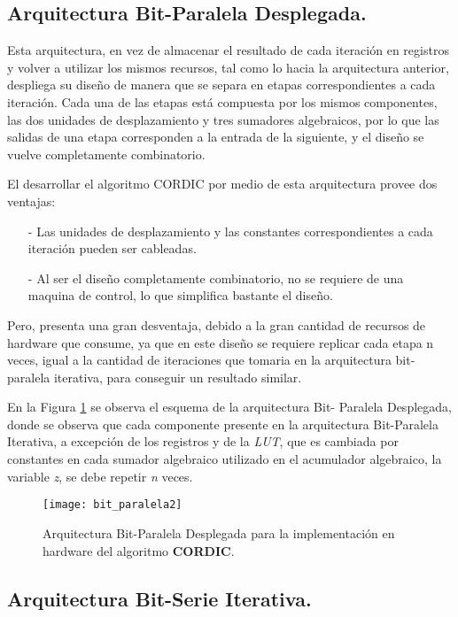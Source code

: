 \subsection{Arquitectura Bit-Paralela Desplegada.}


Esta arquitectura, en vez de almacenar el resultado de cada iteración en registros y volver a utilizar los mismos recursos, tal como lo hacia la arquitectura anterior, despliega su diseño de manera que se separa en etapas correspondientes a cada iteración. Cada una de las etapas está compuesta por los mismos componentes, las dos unidades de desplazamiento y tres sumadores algebraicos, por lo que las salidas de una etapa corresponden a la entrada de la siguiente, y el diseño se vuelve completamente combinatorio.

El desarrollar el algoritmo CORDIC por medio de esta arquitectura provee dos ventajas: 
\begin{itemize}
\item[-]	Las unidades de desplazamiento y las constantes correspondientes a cada iteración pueden ser cableadas.
\item[-]	Al ser el diseño completamente combinatorio, no se requiere de una maquina de control, lo que simplifica bastante el diseño.
\end{itemize}

Pero, presenta una gran desventaja, debido a la gran cantidad de recursos de hardware que consume, ya que en este diseño se requiere replicar cada etapa n veces, igual a la cantidad de iteraciones que tomaria en la arquitectura bit-paralela iterativa, para conseguir un resultado similar.

En la Figura \ref{fig:bit_paralela2} se observa el esquema de la arquitectura Bit- Paralela Desplegada, donde se observa que cada componente presente en la arquitectura Bit-Paralela Iterativa, a excepción de los registros y de la \textit{LUT}, que es cambiada por constantes en cada sumador algebraico utilizado en el acumulador algebraico, la variable \textit{z}, se debe repetir \textit{n} veces.


\begin{figure}[htb]
  \centering
  \texttt{[image: bit\_paralela2]}
  \caption{Arquitectura Bit-Paralela Desplegada para la implementación en hardware del algoritmo \textbf{CORDIC}.}
  \label{fig:bit_paralela2}
\end{figure}

\subsection{Arquitectura Bit-Serie Iterativa.}


